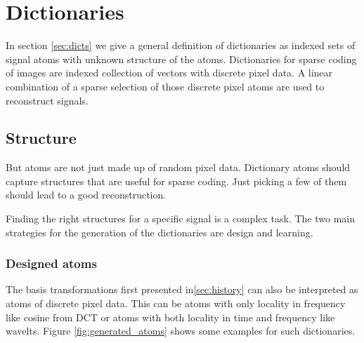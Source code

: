 \chapter{Dictionaries}
In section \ref{sec:dicts} we give a general definition of dictionaries 
as indexed sets of signal atoms with unknown structure of the atoms.
Dictionaries for sparse coding of images are indexed collection of vectors with
discrete pixel data. A linear combination of a sparse selection of those
discrete pixel atoms are used to reconstruct signals. 

\section{Structure}
But atoms are not just made up of random pixel data. Dictionary atoms should
capture structures that are useful for sparse coding. Just picking a few of
them should lead to a good reconstruction. 

Finding the right structures for a specific signal is a complex task.
The two main strategies for the generation of the dictionaries are design and
learning.

\subsection{Designed atoms}
The basis transformations first presented in\ref{sec:history} can also
be interpreted as atoms of discrete pixel data. This can be atoms with only
locality in frequency like cosine from DCT or atoms with both locality in time
and frequency like wavelts. Figure \ref{fig:generated_atoms}
shows some examples for such dictionaries. 


